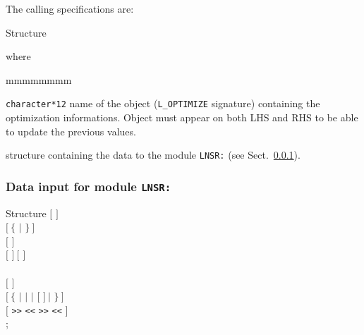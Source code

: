 The calling specifications are:

\begin{DataStructure}{Structure }
 \moc{:=}   \moc{::} 
\end{DataStructure}

\noindent where

\begin{ListeDeDescription}{mmmmmmmm}

\item[\dusa{OPTIM}] \texttt{character*12} name of the  object ({\tt L\_OPTIMIZE} signature) containing the
optimization informations. Object  must appear on both LHS and RHS to be able to update the previous values.

\item[\dstr{lnsr\_data}] structure containing the data to the module \texttt{LNSR:} (see Sect.~\ref{sect:lnsr_data}).

\end{ListeDeDescription}
\vskip 0.2cm
\goodbreak

\subsubsection{Data input for module \texttt{LNSR:}}\label{sect:lnsr_data}

\begin{DataStructure}{Structure }
$[$   $]$ \\
$[~\{$  $|$  $\}~]$ \\
$[$   $]$ \\
$[$   $]~[$   $]$ \\
  \\
$[$   $]$ \\
$[~\{$  $|$  $|$  $|$  $[$  $]~|$  $\}~]$ \\
$[$  {\tt >>}  {\tt <<}   {\tt >>}  {\tt <<} $]$ \\
;
\end{DataStructure}

